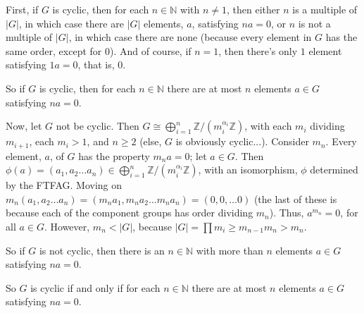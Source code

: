 \documentclass[a4paper,12pt]{article}
\newcommand{\shunt}{\vspace{20mm}}
\newcommand{\absval}[1]{\lvert #1 \rvert}
\newcommand{\al}{\alpha} %
\newcommand{\N}{\mathbb{N}}
\newcommand{\Z}{\mathbb{Z}}
\begin{document}
First, if $G$ is cyclic, then for each $n \in \N$ with $n \neq 1$, then either $n$ is a multiple of $\absval{G}$, in which case there are $\absval{G}$ elements, $a$, satisfying $na = 0$, or $n$ is not a multiple of $\absval{G}$, in which case there are none (because every element in $G$ has the same order, except for $0$). And of course, if $n = 1$, then there's only $1$ element satisfying $1a=0$, that is, $0$.

So if $G$ is cyclic, then for each $n \in \N$ there are at most $n$ elements $a \in G$ satisfying $na =0$.

Now, let $G$ not be cyclic. Then $G \cong \bigoplus\limits_{i=1}^n \Z/(m_i^{\al_i}\Z)$, with each $m_i$ dividing $m_{i+1}$, each $m_i >1$, and $n \geq 2$ (else, $G$ is obviously cyclic...). Consider $m_n$. Every element, $a$, of $G$ has the property $m_na=0$; let $a \in G$. Then $\phi(a)= (a_1,a_2 \ldots a_n) \in \bigoplus\limits_{i=1}^n \Z/(m_i^{\al_i}\Z)$, with an isomorphism, $\phi$ determined by the FTFAG. Moving on $m_n(a_1,a_2 \ldots a_n)=(m_na_1,m_na_2 \ldots m_na_n)=(0,0,\ldots 0)$ (the last of these is because each of the component groups has order dividing $m_n$). Thus, $a^{m_n} = 0$, for all $a \in G$. However, $m_n < \absval{G}$, because $\absval{G} = \prod m_i \geq m_{n-1}m_n > m_n$.

So if $G$ is not cyclic, then there is an $n \in \N$ with more than $n$ elements $a \in G$ satisfying $na=0$.

So $G$ is cyclic if and only if for each $n \in \N$ there are at most $n$ elements $a \in G$ satisfying $na =0$.

\shunt
\end{document}
